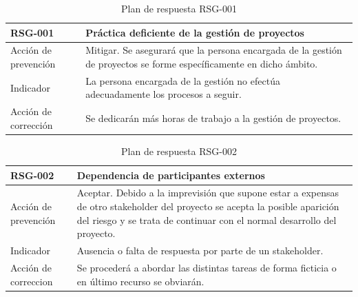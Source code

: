 \begin{table}[htpb]
\centering
\begin{tabularx}{\textwidth}{|l|X|}
\hline
RSG-001              & Práctica deficiente de la gestión de proyectos                                                                      \\ \hline
Acción de prevención & Mitigar. Se asegurará que la persona encargada de la gestión de proyectos se forme específicamente en dicho ámbito. \\ \hline
Indicador            & La persona encargada de la gestión no efectúa adecuadamente los procesos a seguir.                                  \\ \hline
Acción de corrección & Se dedicarán más horas de trabajo a la gestión de proyectos.                                                        \\ \hline
\end{tabularx}
\caption{Plan de respuesta RSG-001}
\end{table}


\begin{table}[htpb]
\centering
\begin{tabularx}{\textwidth}{|l|X|}
\hline
RSG-002              & Dependencia de participantes externos                                                                                                                                                                  \\ \hline
Acción de prevención & Aceptar. Debido a la imprevisión que supone estar a expensas de otro stakeholder del proyecto se acepta la posible aparición del riesgo y se trata de continuar con el normal desarrollo del proyecto. \\ \hline
Indicador            & Ausencia o falta de respuesta por parte de un stakeholder.                                                                                                                                             \\ \hline
Acción de correccion & Se procederá a abordar las distintas tareas de forma ficticia o en último recurso se obviarán.                                                                                                        \\ \hline
\end{tabularx}
\caption{Plan de respuesta RSG-002}
\end{table}



